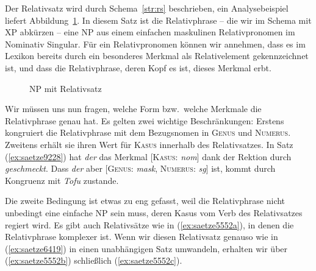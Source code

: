 Der Relativsatz wird durch Schema~\ref{str:rs} beschrieben, ein Analysebeispiel liefert Abbildung~\ref{fig:saetze9228}.
In diesem Satz ist die Relativphrase -- die wir im Schema mit XP abkürzen -- eine NP aus einem einfachen maskulinen Relativpronomen im Nominativ Singular.
Für ein Relativpronomen können wir annehmen, dass es im Lexikon bereits durch ein besonderes Merkmal als Relativelement gekennzeichnet ist, und dass die Relativphrase, deren Kopf es ist, dieses Merkmal erbt.



\begin{figure}[!htbp]
  \centering
  \vspace{0.3cm}
  \caption{NP mit Relativsatz}
  \label{fig:saetze9228}
\end{figure}


Wir müssen uns nun fragen, welche Form bzw.\ welche Merkmale die Relativphrase genau hat.
Es gelten zwei wichtige Beschränkungen:
Erstens kongruiert die Relativphrase mit dem Bezugsnomen in \textsc{Genus} und \textsc{Numerus}.
Zweitens erhält sie ihren Wert für \textsc{Kasus} innerhalb des Relativsatzes.
In Satz (\ref{ex:saetze9228}) hat \textit{der} das Merkmal [\textsc{Kasus}: \textit{nom}] dank der Rektion durch \textit{geschmeckt}.
Dass \textit{der} aber [\textsc{Genus}: \textit{mask}, \textsc{Numerus}: \textit{sg}] ist, kommt durch Kongruenz mit \textit{Tofu} zustande.

Die zweite Bedingung ist etwas zu eng gefasst, weil die Relativphrase nicht unbedingt eine einfache NP sein muss, deren Kasus vom Verb des Relativsatzes regiert wird.
Es gibt auch Relativsätze wie in (\ref{ex:saetze5552a}), in denen die Relativphrase komplexer ist.
Wenn wir diesen Relativsatz genauso wie in (\ref{ex:saetze6419}) in einen unabhängigen Satz umwandeln, erhalten wir über (\ref{ex:saetze5552b}) schließlich (\ref{ex:saetze5552c}).

